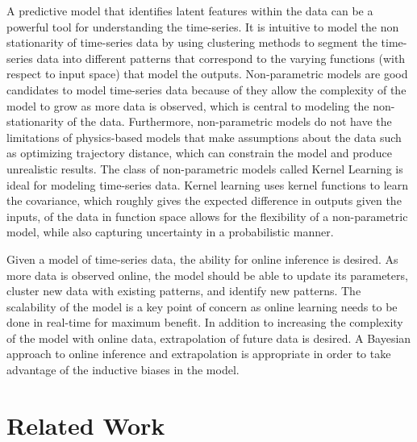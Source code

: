 \documentclass{article}
\begin{document}
A predictive model that identifies latent features within the data can be a powerful tool for understanding the time-series. It is intuitive to model the non stationarity of time-series data by using clustering methods to segment the time-series data into different patterns that correspond to the varying functions (with respect to input space) that model the outputs. Non-parametric models are good candidates to model time-series data because of they allow the complexity of the model to grow as more data is observed, which is central to modeling the non-stationarity of the data. Furthermore, non-parametric models do not have the limitations of physics-based models that make assumptions about the data such as optimizing trajectory distance, which can constrain the model and produce unrealistic results. The class of non-parametric models called Kernel Learning is ideal for modeling time-series data. Kernel learning uses kernel functions to learn the covariance, which roughly gives the expected difference in outputs given the inputs, of the data in function space allows for the flexibility of a non-parametric model, while also capturing uncertainty in a probabilistic manner. 

Given a model of time-series data, the ability for online inference is desired. As more data is observed online, the model should be able to update its parameters, cluster new data with existing patterns, and identify new patterns. The scalability of the model is a key point of concern as online learning needs to be done in real-time for maximum benefit. In addition to increasing the complexity of the model with online data, extrapolation of future data is desired. A Bayesian approach to online inference and extrapolation is appropriate in order to take advantage of the inductive biases in the model.

\section{Related Work} 
 
\end{document}

